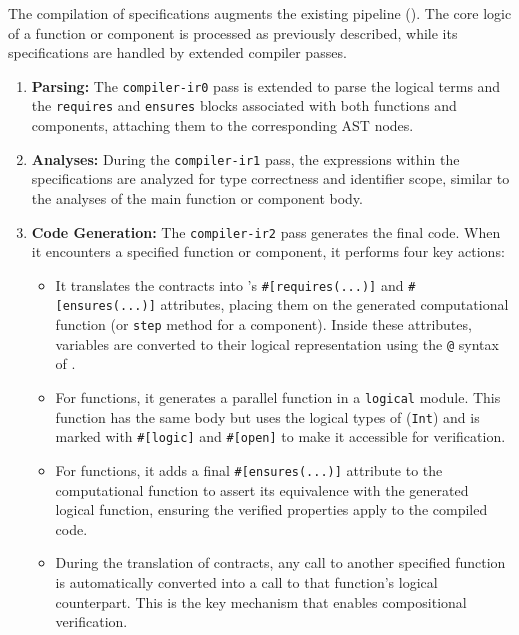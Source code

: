 The compilation of \GReusot specifications augments the existing \GRSync pipeline
(). The core logic of a function or component is processed as
previously described, while its specifications are handled by extended compiler passes.

\begin{enumerate}
    \item \textbf{Parsing:} The \texttt{compiler-ir0} pass is extended to parse the logical terms
          and the \texttt{requires} and \texttt{ensures} blocks associated with both functions and
          components, attaching them to the corresponding AST nodes.

    \item \textbf{Analyses:} During the \texttt{compiler-ir1} pass, the expressions within the
          specifications are analyzed for type correctness and identifier scope, similar to the
          analyses of the main function or component body.

    \item \textbf{Code Generation:} The \texttt{compiler-ir2} pass generates the final \Rust code.
          When it encounters a specified function or component, it performs four key actions:
          \begin{itemize}
              \item It translates the \GReusot contracts into \Creusot's
                    \texttt{\#[requires(...)]} and \texttt{\#[ensures(...)]} attributes,
                    placing them on the generated computational \Rust function (or
                    \texttt{step} method for a component). Inside these attributes,
                    variables are converted to their logical representation using the
                    \texttt{@} syntax of \Creusot.
              \item For functions, it generates a parallel function in a \texttt{logical}
                    module. This function has the same body but uses the logical types of
                    \Creusot (\eg \texttt{Int}) and is marked with \texttt{\#[logic]} and
                    \texttt{\#[open]} to make it accessible for verification.
              \item For functions, it adds a final \texttt{\#[ensures(...)]} attribute to
                    the computational function to assert its equivalence with the
                    generated logical function, ensuring the verified properties apply to
                    the compiled code.
              \item During the translation of contracts, any call to another specified function is
                    automatically converted into a call to that function's logical counterpart. This
                    is the key mechanism that enables compositional verification.
          \end{itemize}
\end{enumerate}

